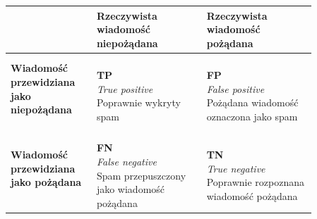 \begin{tabular}{
    |>{\centering\arraybackslash}m{0.24\linewidth}
    |>{\centering\arraybackslash}m{0.31\linewidth}
    |>{\centering\arraybackslash}m{0.31\linewidth}|}
    \hline
    & \textbf{Rzeczywista wiadomość niepożądana}
    & \textbf{Rzeczywista wiadomość pożądana} \\
    \hline
    \textbf{Wiadomość przewidziana jako niepożądana}
    & \shortstack[c]{\\[0.2em]{\textbf{TP}}\\[0.2em]\small\emph{True positive}\\\small Poprawnie wykryty spam}
    & \shortstack[c]{\\[0.2em]{\textbf{FP}}\\[0.2em]\small\emph{False positive}\\\small Pożądana wiadomość\\\small oznaczona jako spam} \\
    \hline
    \textbf{Wiadomość przewidziana jako pożądana}
    & \shortstack[c]{\\[0.2em]{\textbf{FN}}\\[0.2em]\small\emph{False negative}\\\small Spam przepuszczony\\\small jako wiadomość pożądana}
    & \shortstack[c]{\\[0.2em]{\textbf{TN}}\\[0.2em]\small\emph{True negative}\\\small Poprawnie rozpoznana\\\small wiadomość pożądana} \\
    \hline
\end{tabular}

